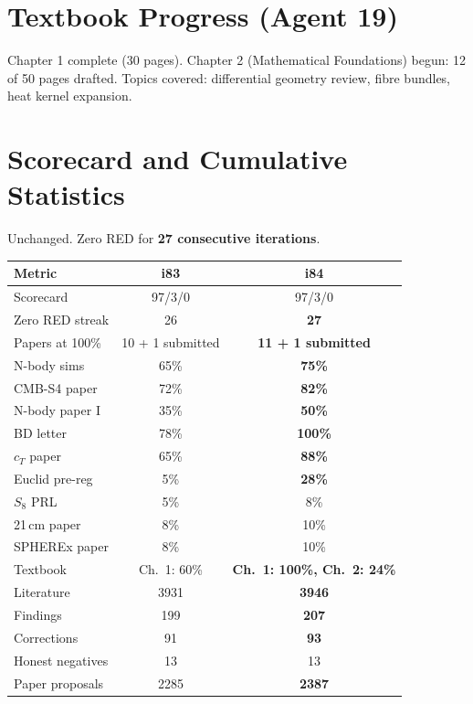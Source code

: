 \documentclass[11pt,a4paper]{article}
\begin{document}
\section{Textbook Progress (Agent 19)}

Chapter 1 complete (30 pages). Chapter 2 (Mathematical Foundations) begun: 12 of 50 pages drafted. Topics covered: differential geometry review, fibre bundles, heat kernel expansion.

\section{Scorecard and Cumulative Statistics}

\begin{tcolorbox}[colback=green!5!white, colframe=dfdgreen, title=\textbf{Scorecard: 97 GREEN / 3 YELLOW / 0 RED}]
Unchanged. Zero RED for \textbf{27 consecutive iterations}.
\end{tcolorbox}

\begin{center}
\begin{tabular}{lcc}
\toprule
\textbf{Metric} & \textbf{i83} & \textbf{i84} \\
\midrule
Scorecard & 97/3/0 & 97/3/0 \\
Zero RED streak & 26 & \textbf{27} \\
Papers at 100\% & 10 + 1 submitted & \textbf{11 + 1 submitted} \\
N-body sims & 65\% & \textbf{75\%} \\
CMB-S4 paper & 72\% & \textbf{82\%} \\
N-body paper I & 35\% & \textbf{50\%} \\
BD letter & 78\% & \textbf{100\%} \\
$c_T$ paper & 65\% & \textbf{88\%} \\
Euclid pre-reg & 5\% & \textbf{28\%} \\
$S_8$ PRL & 5\% & 8\% \\
21\,cm paper & 8\% & 10\% \\
SPHEREx paper & 8\% & 10\% \\
Textbook & Ch.\ 1: 60\% & \textbf{Ch.\ 1: 100\%, Ch.\ 2: 24\%} \\
Literature & 3931 & \textbf{3946} \\
Findings & 199 & \textbf{207} \\
Corrections & 91 & \textbf{93} \\
Honest negatives & 13 & 13 \\
Paper proposals & 2285 & \textbf{2387} \\
\bottomrule
\end{tabular}
\end{center}
\end{document}
